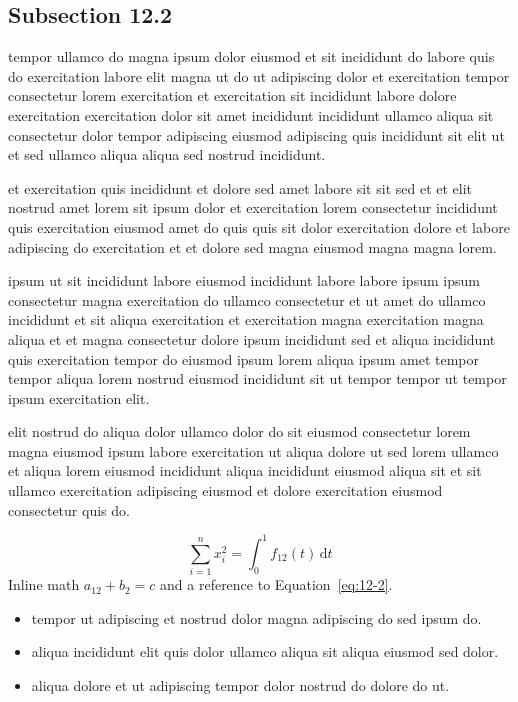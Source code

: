 \documentclass{article}
\begin{document}
\subsection{Subsection 12.2}\label{sec:12-2}
tempor ullamco do magna ipsum dolor eiusmod et sit incididunt do labore quis do exercitation labore elit magna ut do ut adipiscing dolor et exercitation tempor consectetur lorem exercitation et exercitation sit incididunt labore dolore exercitation exercitation dolor sit amet incididunt incididunt ullamco aliqua sit consectetur dolor tempor adipiscing eiusmod adipiscing quis incididunt sit elit ut et sed ullamco aliqua aliqua sed nostrud incididunt.

et exercitation quis incididunt et dolore sed amet labore sit sit sed et et elit nostrud amet lorem sit ipsum dolor et exercitation lorem consectetur incididunt quis exercitation eiusmod amet do quis quis sit dolor exercitation dolore et labore adipiscing do exercitation et et dolore sed magna eiusmod magna magna lorem.

ipsum ut sit incididunt labore eiusmod incididunt labore labore ipsum ipsum consectetur magna exercitation do ullamco consectetur et ut amet do ullamco incididunt et sit aliqua exercitation et exercitation magna exercitation magna aliqua et et magna consectetur dolore ipsum incididunt sed et aliqua incididunt quis exercitation tempor do eiusmod ipsum lorem aliqua ipsum amet tempor tempor aliqua lorem nostrud eiusmod incididunt sit ut tempor tempor ut tempor ipsum exercitation elit.

elit nostrud do aliqua dolor ullamco dolor do sit eiusmod consectetur lorem magna eiusmod ipsum labore exercitation ut aliqua dolore ut sed lorem ullamco et aliqua lorem eiusmod incididunt aliqua incididunt eiusmod aliqua sit et sit ullamco exercitation adipiscing eiusmod et dolore exercitation eiusmod consectetur quis do.

\begin{equation}\label{eq:12-2}
  \sum_{i=1}^{n} x_i^{2} = \int_0^1 f_{12}(t)\,\mathrm{d}t
\end{equation}
Inline math $a_{12} + b_{2} = c$ and a reference to Equation~\eqref{eq:12-2}.

\begin{itemize}
  \item tempor ut adipiscing et nostrud dolor magna adipiscing do sed ipsum do.
  \item aliqua incididunt elit quis dolor ullamco aliqua sit aliqua eiusmod sed dolor.
  \item aliqua dolore et ut adipiscing tempor dolor nostrud do dolore do ut.
\end{itemize}
\end{document}
